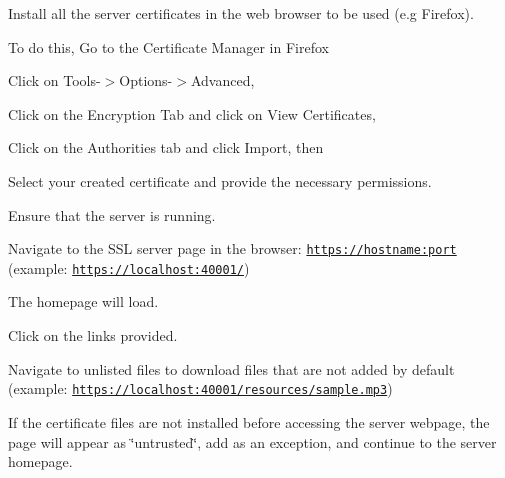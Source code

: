 \begin{DoxyEnumerate}
\item Install all the server certificates in the web browser to be used (e.\+g Firefox).
\item To do this, Go to the Certificate Manager in Firefox
\begin{DoxyItemize}
\item Click on Tools-\/$>$Options-\/$>$Advanced,
\item Click on the Encryption Tab and click on View Certificates,
\item Click on the Authorities tab and click Import, then
\item Select your created certificate and provide the necessary permissions.
\end{DoxyItemize}
\item Ensure that the server is running.
\item Navigate to the S\+SL server page in the browser\+: \href{https://hostname:port}{\tt https\+://hostname\+:port} (example\+: \href{https://localhost:40001/}{\tt https\+://localhost\+:40001/})
\item The homepage will load.
\item Click on the links provided.
\item Navigate to unlisted files to download files that are not added by default (example\+: \href{https://localhost:40001/resources/sample.mp3}{\tt https\+://localhost\+:40001/resources/sample.\+mp3})
\end{DoxyEnumerate}
\begin{DoxyItemize}
\item If the certificate files are not installed before accessing the server webpage, the page will appear as \char`\"{}untrusted\char`\"{}, add as an exception, and continue to the server homepage. 
\end{DoxyItemize}